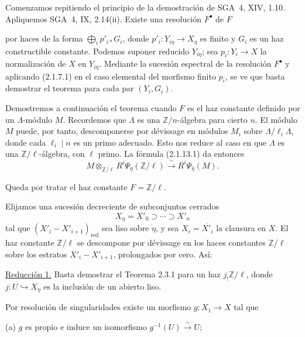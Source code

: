 Comenzamos repitiendo el principio de la demostración de SGA~4, XIV, 1.10.
Apliquemos SGA~4, IX, 2.14(ii). Existe una resolución $F^\bullet$ de $F$
\begin{center}
\end{center}
por haces de la forma $\bigoplus_i p'_{i*}G_i$, donde
$p'_i:Y_{i\eta}\longrightarrow X_\eta$ es finito y $G_i$ es un haz
constructible constante. Podemos suponer reducido $Y_{i\eta}$; sea
$p_i:Y_i\longrightarrow X$ la normalización de $X$ en $Y_{i\eta}$. Mediante
la sucesión espectral de la resolución $F^\bullet$ y aplicando (2.1.7.1) en el
caso elemental del morfismo finito $p_i$, se ve que basta demostrar el teorema
para cada par $(Y_i,G_i)$.

Demostremos a continuación el teorema cuando $F$ es el haz constante definido
por un $\Lambda$-módulo $M$. Recordemos que $\Lambda$ es una
$\mathbb Z/n$-álgebra para cierto $n$. El módulo $M$ puede, por tanto,
descomponerse por dévissage en módulos $M_i$ sobre
$\Lambda/\ell_i\Lambda$, donde cada $\ell_i\mid n$ es un primo adecuado.
Esto nos reduce al caso en que $\Lambda$ es una $\mathbb Z/\ell$-álgebra, con
$\ell$ primo. La fórmula (2.1.13.1) da entonces
\[
M\otimes_{\mathbb Z/\ell}
R^i\Psi_{\bar\eta}(\mathbb Z/\ell)
\xrightarrow{\ \sim\ }
R^i\Psi_{\bar\eta}(M).
\]
\pageoriginale

Queda por tratar el haz constante $F=\mathbb Z/\ell$.

Elijamos una sucesión decreciente de subconjuntos cerrados
\[
X_\eta=X'_0\supset\cdots\supset X'_n
\]
tal que $(X'_i-X'_{i+1})_{\mathrm{red}}$ sea liso sobre $\eta$, y sea
$X_i=\overline{X'_i}$ la clausura en $X$. El haz constante
$\mathbb Z/\ell$ se descompone por dévissage en los haces constantes
$\mathbb Z/\ell$ sobre los estratos $X'_i-X'_{i+1}$, prolongados por cero.
Así:

\medskip
\noindent\underline{Reducción 1.}
Basta demostrar el Teorema 2.3.1 para un haz $j_!\mathbb Z/\ell$, donde
$j:U\hookrightarrow X_\eta$ es la inclusión de un abierto liso.

Por resolución de singularidades existe un morfismo
$g:X_1\longrightarrow X$ tal que

\medskip
\noindent(a) $g$ es propio e induce un isomorfismo
$g^{-1}(U)\xrightarrow{\sim}U$;

